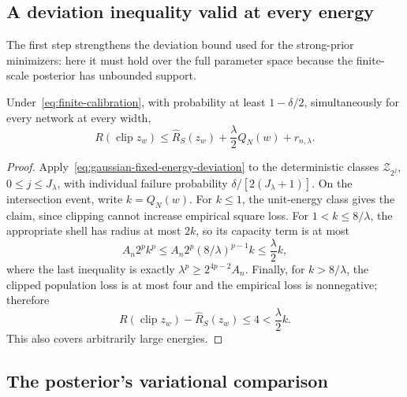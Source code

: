\subsection{A deviation inequality valid at every energy}

The first step strengthens the deviation bound used for the
strong-prior minimizers: here it must hold over the full parameter
space because the finite-scale posterior has unbounded support.

\begin{lemma}
\label{lem:finite-global-deviation}
Under~\eqref{eq:finite-calibration}, with probability at least
$1-\delta/2$, simultaneously for every network at every width,
\begin{equation}
 R(\operatorname{clip}z_w)
     \leq\widehat R_S(z_w)+\frac\lambda2 Q_N(w)+r_{n,\lambda}.
 \label{eq:finite-global-deviation}
\end{equation}
\end{lemma}
\begin{proof}
Apply~\eqref{eq:gaussian-fixed-energy-deviation} to the deterministic
classes $\mathcal Z_{2^j}$, $0\leq j\leq J_\lambda$, with individual
failure probability $\delta/[2(J_\lambda+1)]$.
On the intersection event, write $k=Q_N(w)$.  For $k\leq1$, the
unit-energy class gives the claim, since clipping cannot increase
empirical square loss.  For $1<k\leq8/\lambda$, the appropriate shell
has radius at most $2k$, so its capacity term is at most
\[
 A_n2^p k^p
 \leq A_n2^p(8/\lambda)^{p-1}k
 \leq\frac\lambda2 k,
\]
where the last inequality is exactly
$\lambda^p\geq2^{4p-2}A_n$.
Finally, for $k>8/\lambda$, the clipped population loss is at most
four and the empirical loss is nonnegative; therefore
\[
 R(\operatorname{clip}z_w)-\widehat R_S(z_w)
   \leq4<\frac\lambda2 k.
\]
This also covers arbitrarily large energies.
\end{proof}

\subsection{The posterior's variational comparison}

